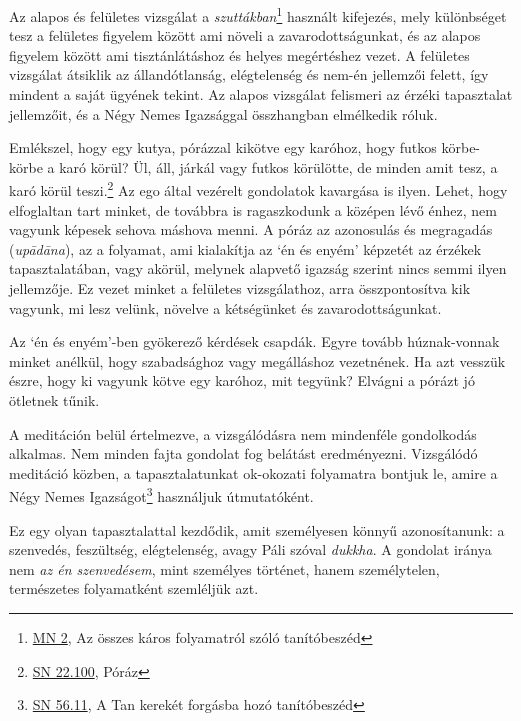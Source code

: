 Az alapos és felületes vizsgálat a \emph{szuttákban}\footnote{\href{https://a-buddha-ujja.hu/mn-2/hu/forizs-laszlo}{MN
  2}, Az összes káros folyamatról szóló tanítóbeszéd} használt
kifejezés, mely különbséget tesz a felületes figyelem között ami növeli
a zavarodottságunkat, és az alapos figyelem között ami tisztánlátáshoz
és helyes megértéshez vezet. A felületes vizsgálat átsiklik az
állandótlanság, elégtelenség és nem-én jellemzői felett, így mindent a
saját ügyének tekint. Az alapos vizsgálat felismeri az érzéki
tapasztalat jellemzőit, és a Négy Nemes Igazsággal összhangban
elmélkedik róluk.


Emlékszel, hogy egy kutya, pórázzal kikötve egy karóhoz, hogy futkos
körbe-körbe a karó körül? Ül, áll, járkál vagy futkos körülötte, de
minden amit tesz, a karó körül teszi.\footnote{\href{https://suttacentral.net/sn22.100}{SN
  22.100}, Póráz} Az ego által vezérelt gondolatok kavargása is ilyen.
Lehet, hogy elfoglaltan tart minket, de továbbra is ragaszkodunk a
középen lévő énhez, nem vagyunk képesek sehova máshova menni. A póráz az
azonosulás és megragadás (\emph{upādāna}), az a folyamat, ami kialakítja
az `én és enyém' képzetét az érzékek tapasztalatában, vagy akörül,
melynek alapvető igazság szerint nincs semmi ilyen jellemzője. Ez vezet
minket a felületes vizsgálathoz, arra összpontosítva kik vagyunk, mi
lesz velünk, növelve a kétségünket és zavarodottságunkat.

Az `én és enyém'-ben gyökerező kérdések csapdák. Egyre tovább
húznak-vonnak minket anélkül, hogy szabadsághoz vagy megálláshoz
vezetnének. Ha azt vesszük észre, hogy ki vagyunk kötve egy karóhoz, mit
tegyünk? Elvágni a pórázt jó ötletnek tűnik.

A meditáción belül értelmezve, a vizsgálódásra nem mindenféle
gondolkodás alkalmas. Nem minden fajta gondolat fog belátást
eredményezni. Vizsgálódó meditáció közben, a tapasztalatunkat ok-okozati
folyamatra bontjuk le, amire a Négy Nemes Igazságot\footnote{\href{https://a-buddha-ujja.hu/sn-56.11/hu/farkas-pal}{SN
  56.11}, A Tan kerekét forgásba hozó tanítóbeszéd} használjuk
útmutatóként.

Ez egy olyan tapasztalattal kezdődik, amit személyesen könnyű
azonosítanunk: a szenvedés, feszültség, elégtelenség, avagy Páli szóval
\emph{dukkha}. A gondolat iránya nem \emph{az én szenvedésem}, mint
személyes történet, hanem személytelen, természetes folyamatként
szemléljük azt.

